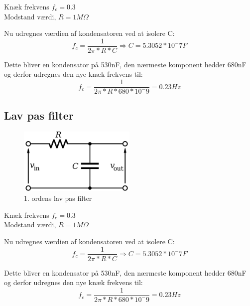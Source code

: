 Knæk frekvens $f_c = 0.3$ \\
Modstand værdi, $R = 1M\Omega$

Nu udregnes værdien af kondensatoren ved at isolere C: 
\begin{equation}
	f_c = \frac{1}{2\pi * R * C} \Rightarrow C = 5.3052 * 10^-7F
\end{equation}


Dette bliver en kondensator på 530nF, den nærmeste komponent hedder 680nF og derfor udregnes den nye knæk frekvens til: 
\begin{equation}
	f_c = \frac{1}{2\pi * R * 680 * 10^-9} = 0.23Hz
\end{equation}



\subsection{Lav pas filter}
\begin{figure}[H]
	\centering
	\includegraphics[width = 0.5\textwidth]{billeder/LowPass.png}
	\caption{1. ordens lav pas filter}\label{fig:lowpass}
\end{figure}
Knæk frekvens $f_c = 0.3$ \\
Modstand værdi, $R = 1M\Omega$

Nu udregnes værdien af kondensatoren ved at isolere C:
\begin{equation}
	f_c = \frac{1}{2\pi * R * C} \Rightarrow C = 5.3052 * 10^-7F
\end{equation}


Dette bliver en kondensator på 530nF, den nærmeste komponent hedder 680nF og derfor udregnes den nye knæk frekvens til:
\begin{equation}
	 f_c = \frac{1}{2\pi * R * 680 * 10^-9} = 0.23Hz
\end{equation}


\newpage
